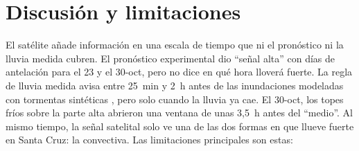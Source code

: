 \documentclass{sosg-informe}
\begin{document}
\section{Discusión y limitaciones}

El satélite añade información en una escala de tiempo que ni el pronóstico ni la lluvia medida cubren. El pronóstico experimental \citep{sosg202608} dio \enquote{señal alta} con días de antelación para el 23 y el 30-oct, pero no dice en qué hora lloverá fuerte. La regla de lluvia medida \citep{sosg202607} avisa entre 25~min y 2~h antes de las inundaciones modeladas con tormentas sintéticas \citep{sosg202602}, pero solo cuando la lluvia ya cae. El 30-oct, los topes fríos sobre la parte alta abrieron una ventana de unas 3,5~h antes del \enquote{medio}. Al mismo tiempo, la señal satelital solo ve una de las dos formas en que llueve fuerte en Santa Cruz: la convectiva. Las limitaciones principales son estas:
\end{document}

